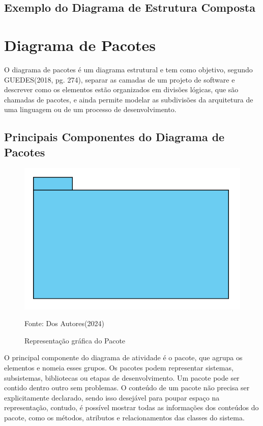 \documentclass[12pt,openright,oneside,a4paper,
	chapter=TITLE,
	section=TITLE,
	english,brazil]{abntex2}
\begin{document}
\section{Exemplo do Diagrama de Estrutura Composta}

\chapter{Diagrama de Pacotes}

O diagrama de pacotes é um diagrama estrutural e tem como objetivo, segundo GUEDES(2018, pg. 274), separar as camadas de um projeto de software e descrever como os elementos estão organizados em divisões lógicas, que são chamadas de pacotes, e ainda permite modelar as subdivisões da arquitetura de uma linguagem ou de um processo de desenvolvimento.

\section{Principais Componentes do Diagrama de Pacotes}

\begin{figure}
	\caption{Representação gráfica do Pacote}
	\centering
	\includegraphics[scale=0.5]{img/Pacote.png}
	\\

	\label{ElementoPacote}
	\footnotesize\raggedright Fonte: Dos Autores(2024)
\end{figure}

O principal componente do diagrama de atividade é o pacote, que agrupa os elementos e nomeia esses grupos. Os pacotes podem representar sistemas, subsistemas, bibliotecas ou etapas de desenvolvimento. Um pacote pode ser contido dentro outro sem problemas. O conteúdo de um pacote não precisa ser explicitamente declarado, sendo isso desejável para poupar espaço na representação, contudo, é possível mostrar todas as informações dos conteúdos do pacote, como os métodos, atributos e relacionamentos das classes do sistema.
\end{document}
